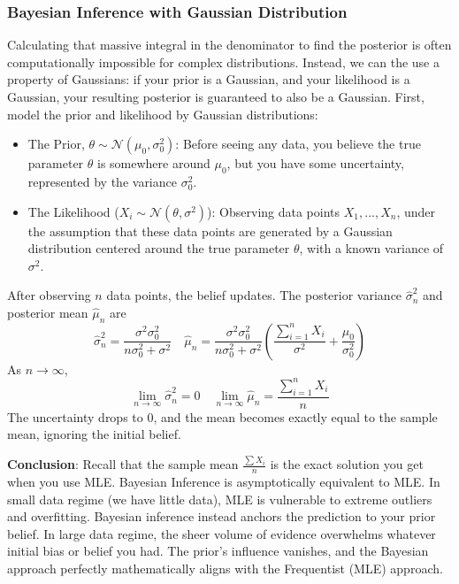 \documentclass[../Probability.tex]{subfiles}
\begin{document}
\subsubsection{Bayesian Inference with Gaussian Distribution}
Calculating that massive integral in the denominator to find the posterior is often computationally impossible for complex distributions.\newline
Instead, we can the use a property of Gaussians: if your prior is a Gaussian, and your likelihood is a Gaussian, your resulting posterior is guaranteed to also be a Gaussian.\newline
First, model the prior and likelihood by Gaussian distributions:
\begin{itemize}
    \item The Prior, $\theta \sim \mathcal{N}(\mu_0, \sigma_0^2)$: Before seeing any data, you believe the true parameter $\theta$ is somewhere around $\mu_0$, but you have some uncertainty, represented by the variance $\sigma_0^2$.
    \item The Likelihood ($X_i \sim \mathcal{N}(\theta, \sigma^2)$): Observing data points $X_1, ..., X_n$, under the assumption that these data points are generated by a Gaussian distribution centered around the true parameter $\theta$, with a known variance of $\sigma^2$.
\end{itemize}
After observing $n$ data points, the belief updates.
The posterior variance $\hat{\sigma}_n^2$ and posterior mean $\hat{\mu}_n$ are
$$\hat{\sigma}_n^2 = \frac{\sigma^2 \sigma_0^2}{n\sigma_0^2 + \sigma^2} \quad \hat{\mu}_n = \frac{\sigma^2\sigma_0^2}{n\sigma_0^2 + \sigma^2} \left( \frac{\sum_{i=1}^{n}X_i}{\sigma^2} + \frac{\mu_0}{\sigma_0^2} \right)$$
As $n \to \infty$,
$$\lim_{n \rightarrow \infty} \hat{\sigma}_n^2 = 0 \quad \lim_{n \rightarrow \infty} \hat{\mu}_n = \frac{\sum_{i=1}^{n}X_i}{n}$$
The uncertainty drops to 0, and the mean becomes exactly equal to the sample mean, ignoring the initial belief.\newline

\medskip
\noindent\textbf{Conclusion}: Recall that the sample mean $\frac{\sum X_i}{n}$ is the exact solution you get when you use MLE.\newline
Bayesian Inference is asymptotically equivalent to MLE.\newline
In small data regime (we have little data), MLE is vulnerable to extreme outliers and overfitting. Bayesian inference instead anchors the prediction to your prior belief.\newline
In large data regime, the sheer volume of evidence overwhelms whatever initial bias or belief you had. The prior's influence vanishes, and the Bayesian approach perfectly mathematically aligns with the Frequentist (MLE) approach.
\end{document}
